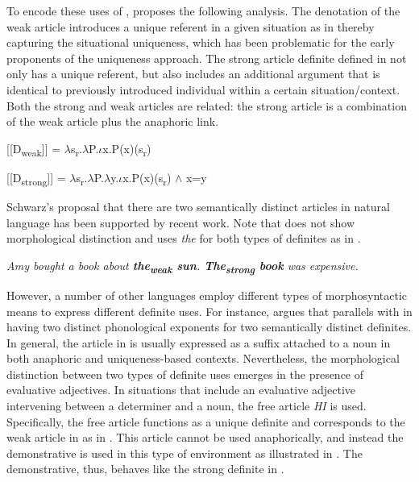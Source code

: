 \documentclass[output=paper,
modfonts
]{langscibook}
\begin{document}
To encode these uses of , \citet{Schwarz2009,Schwarz2013} proposes the following analysis. The denotation of the weak article introduces a unique referent in a given situation as in  thereby capturing the situational uniqueness, which has been problematic for the early proponents of the uniqueness approach. The strong article definite defined in  not only has a unique referent, but also includes an additional argument that is identical to previously introduced individual within a certain situation/context. Both the strong and weak articles are related: the strong article is a combination of the weak article plus the anaphoric link. 


\begin{exe} 
\ex \label{ex:sereikaite:18}
 {} [[D\textsubscript{weak}]] = $\lambda$s\textsubscript{r}.$\lambda$P.$\iota$x.P(x)(s\textsubscript{r})  \citep[264]{Schwarz2009}
\end{exe} 

\begin{exe} 
\ex \label{ex:sereikaite:19}
{} [[D\textsubscript{strong}]] = $\lambda$s\textsubscript{r}.$\lambda$P.$\lambda$y.$\iota$x.P(x)(s\textsubscript{r}) $\land$ x=y \citep[260]{Schwarz2009}
\end{exe} 

Schwarz's proposal that there are two semantically distinct articles in natural language has been supported by recent work. Note that  does not show morphological distinction and uses \textit{the} for both types of definites as in .

\begin{exe}
\ex \label{ex:sereikaite:20}
\textit{Amy bought a book about \textbf{the\textsubscript{weak} sun}. \textbf{The\textsubscript{strong} book} was expensive.} \citep[115]{Ingason2016}
\end{exe}

However, a number of other languages employ different types of morphosyntactic means to express different definite uses. For instance, \citet{Ingason2016} argues that  parallels with  in having two distinct phonological exponents for two semantically distinct definites. In general, the article in  is usually expressed as a suffix attached to a noun in both anaphoric and uniqueness-based contexts. Nevertheless, the morphological distinction between two types of definite uses emerges in the presence of evaluative adjectives. In situations that include an evaluative adjective intervening between a determiner and a noun, the free article 
\textit{HI} is used. Specifically, the free article functions as a unique definite and corresponds to the weak article in  as in . This article cannot be used anaphorically, and instead the demonstrative is used in this type of environment as illustrated in . The demonstrative, thus, behaves like the strong definite in .  
\end{document}
